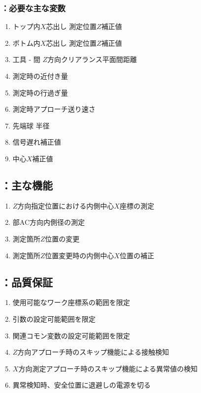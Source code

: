 \subsubsection{\MXIWidth：必要な主な変数}
\begin{enumerate}[label*=\sarrow]
\item トップ内$X$芯出し 測定位置$Z$補正値
\item ボトム内$X$芯出し 測定位置$Z$補正値
\item 工具 - \EndFace 間 $Z$方向クリアランス平面間距離
\item \TouchSensorProbe 測定時の近付き量
\item \TouchSensorProbe 測定時の行過ぎ量
\item \TouchSensorProbe 測定時アプローチ送り速さ
\item \TouchSensorProbe 先端球 半径
\item \TouchSensorProbe 信号遅れ補正値
\item \TouchSensorProbe 中心$X$補正値
\end{enumerate}


\clearpage
\subsection{\MXIWidth：主な機能}
\begin{enumerate}[label*=\sarrow]
\item $Z$方向指定位置における内側中心$X$座標の測定
\item \EndFace 部AC方向内側径の測定
\item 測定箇所$Z$位置の変更
\item 測定箇所$Z$位置変更時の内側中心$X$位置の補正
\end{enumerate}


\subsection{\MXIWidth：品質保証}
\begin{enumerate}[label*=\sarrow]
\item 使用可能なワーク座標系の範囲を限定
\item {}引数の設定可能範囲を限定
\item 関連コモン変数の設定可能範囲を限定
\item $Z$方向アプローチ時のスキップ機能による接触検知
\item $X$方向測定アプローチ時のスキップ機能による異常値の検知
\item 異常検知時、安全位置に退避し\TouchSensorProbe の電源を切る
\end{enumerate}



